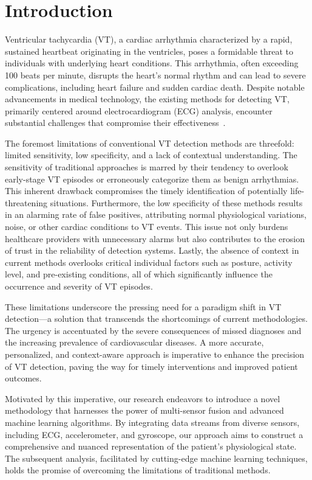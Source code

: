 \section{Introduction}
Ventricular tachycardia (VT), a cardiac arrhythmia characterized by a rapid, sustained heartbeat originating in the ventricles, poses a formidable threat to individuals with underlying heart conditions. This arrhythmia, often exceeding 100 beats per minute, disrupts the heart's normal rhythm and can lead to severe complications, including heart failure and sudden cardiac death. 
Despite notable advancements in medical technology, the existing methods for detecting VT, primarily centered around electrocardiogram (ECG) analysis, encounter substantial challenges that compromise their effectiveness~\cite{wellens2001ventricular}\cite{6570512}.      

The foremost limitations of conventional VT detection methods are threefold: limited sensitivity, low specificity, and a lack of contextual understanding. The sensitivity of traditional approaches is marred by their tendency to overlook early-stage VT episodes or erroneously categorize them as benign arrhythmias. This inherent drawback compromises the timely identification of potentially life-threatening situations. Furthermore, the low specificity of these methods results in an alarming rate of false positives, attributing normal physiological variations, noise, or other cardiac conditions to VT events. This issue not only burdens healthcare providers with unnecessary alarms but also contributes to the erosion of trust in the reliability of detection systems. Lastly, the absence of context in current methods overlooks critical individual factors such as posture, activity level, and pre-existing conditions, all of which significantly influence the occurrence and severity of VT episodes.

These limitations underscore the pressing need for a paradigm shift in VT detection—a solution that transcends the shortcomings of current methodologies. The urgency is accentuated by the severe consequences of missed diagnoses and the increasing prevalence of cardiovascular diseases. A more accurate, personalized, and context-aware approach is imperative to enhance the precision of VT detection, paving the way for timely interventions and improved patient outcomes.

Motivated by this imperative, our research endeavors to introduce a novel methodology that harnesses the power of multi-sensor fusion and advanced machine learning algorithms. By integrating data streams from diverse sensors, including ECG, accelerometer, and gyroscope, our approach aims to construct a comprehensive and nuanced representation of the patient's physiological state. The subsequent analysis, facilitated by cutting-edge machine learning techniques, holds the promise of overcoming the limitations of traditional methods.

